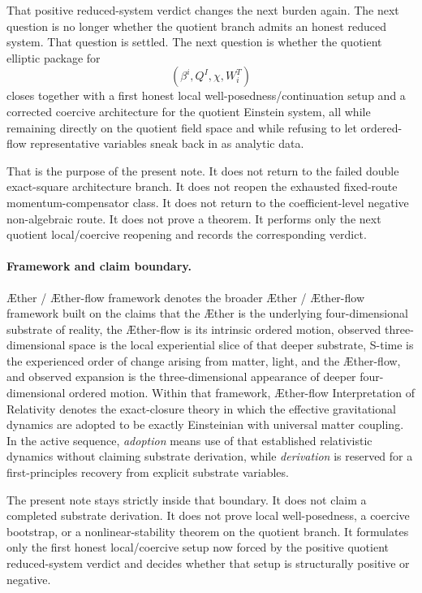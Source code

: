 \documentclass[11pt]{article}
\newcommand{\Aether}{\AE{}ther}
\newcommand{\Aflow}{\AE{}ther-flow}
\newcommand{\TheoryName}{\Aflow{} Interpretation of Relativity}
\newcommand{\TheoryProgram}{\Aether{} / \Aflow{} framework}
\begin{document}
That positive reduced-system verdict changes the next burden again. The next question is no longer whether the quotient branch admits an honest reduced system. That question is settled. The next question is whether the quotient elliptic package for
\[
(\beta^i,Q^I,\chi,W_i^T)
\]
closes together with a first honest local well-posedness/continuation setup and a corrected coercive architecture for the quotient Einstein system, all while remaining directly on the quotient field space and while refusing to let ordered-flow representative variables sneak back in as analytic data.

That is the purpose of the present note. It does not return to the failed double exact-square architecture branch. It does not reopen the exhausted fixed-route momentum-compensator class. It does not return to the coefficient-level negative non-algebraic route. It does not prove a theorem. It performs only the next quotient local/coercive reopening and records the corresponding verdict.

\paragraph{Framework and claim boundary.}
\TheoryProgram{} denotes the broader \Aether{} / \Aflow{} framework built on the claims that the \Aether{} is the underlying four-dimensional substrate of reality, the \Aflow{} is its intrinsic ordered motion, observed three-dimensional space is the local experiential slice of that deeper substrate, S-time is the experienced order of change arising from matter, light, and the \Aflow{}, and observed expansion is the three-dimensional appearance of deeper four-dimensional ordered motion. Within that framework, \TheoryName{} denotes the exact-closure theory in which the effective gravitational dynamics are adopted to be exactly Einsteinian with universal matter coupling. In the active sequence, \emph{adoption} means use of that established relativistic dynamics without claiming substrate derivation, while \emph{derivation} is reserved for a first-principles recovery from explicit substrate variables.

The present note stays strictly inside that boundary. It does not claim a completed substrate derivation. It does not prove local well-posedness, a coercive bootstrap, or a nonlinear-stability theorem on the quotient branch. It formulates only the first honest local/coercive setup now forced by the positive quotient reduced-system verdict and decides whether that setup is structurally positive or negative.
\end{document}
